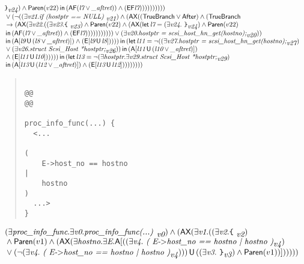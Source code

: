 \documentclass{article}
\newcommand{\U}{\,\mbox{\sf{U}}\,}
\newcommand{\A}{\mbox{\sf{A}}}
\newcommand{\E}{\mbox{\sf{E}}}
\newcommand{\AX}{\mbox{\sf{AX}}}
\newcommand{\AF}{\mbox{\sf{AF}}}
\newcommand{\EF}{\mbox{\sf{EF}}}
\newcommand{\mita}[1]{\mbox{\it{{#1}}}}
\newcommand{\msf}[1]{\mbox{\sf{{#1}}}}
\newcommand{\mth}[1]{\({#1}\)}
\newcommand{\ttlb}{\mbox{\tt \char'173}}
\newcommand{\ttrb}{\mbox{\tt \char'175}}
\begin{document}
\[\begin{array}{l}
{{\ttrb}}_{\mita{v24}}) \wedge \msf{Paren}(v22) \, \mita{\sf{in}} \, (\AF(\mita{l7} \vee \mita{\_aftret})) \wedge (\EF\mita{l7})
)))))))))\\\mbox{} \vee (\neg ((\exists \mita{v21} . \mita{if (hostptr == NULL) }_{\mita{v21}}) \wedge (\AX((\msf{TrueBranch} \vee \msf{After}) \wedge (\msf{TrueBranch}\\\mbox{} \rightarrow (\AX(\exists \mita{v22} . ((\exists \mita{v23} . \mita{{\ttlb}
  }_{\mita{v23}}) \wedge \msf{Paren}(v22) \wedge (\AX(\mita{\sf{let}} \, \mita{l7} = (\exists \mita{v24} . \mita{
{\ttrb}}_{\mita{v24}}) \wedge \msf{Paren}(v22)\\\mbox{} \, \mita{\sf{in}} \, (\AF(\mita{l7} \vee \mita{\_aftret})) \wedge (\EF\mita{l7})
)))))))))) \vee (\exists \mita{v20} . \mita{hostptr = scsi\_host\_hn\_get(hostno);}_{\mita{v20}}))\\\mbox{} \, \mita{\sf{in}} \, (\A[\mita{l9} \U (\mita{l8} \vee \mita{\_aftret})]
) \wedge (\E[\mita{l9} \U \mita{l8}]
)
)
)) \, \mita{\sf{in}} \, (\mita{\sf{let}} \, \mita{l11} = \neg ((\exists \mita{v27} . \mita{hostptr = scsi\_host\_hn\_get(hostno);}_{\mita{v27}})\\\mbox{} \vee (\exists \mita{v26} . \mita{struct Scsi\_Host *hostptr;}_{\mita{v26}})) \, \mita{\sf{in}} \, (\A[\mita{l11} \U (\mita{l10} \vee \mita{\_aftret})]
)\\\mbox{} \wedge (\E[\mita{l11} \U \mita{l10}]
)
)
))) \, \mita{\sf{in}} \, (\mita{\sf{let}} \, \mita{l13} = \neg (\exists \mita{hostptr} . \exists \mita{v29} . \mita{struct Scsi\_Host *hostptr;}_{\mita{v29}})\\\mbox{} \, \mita{\sf{in}} \, (\A[\mita{l13} \U (\mita{l12} \vee \mita{\_aftret})]
) \wedge (\E[\mita{l13} \U \mita{l12}]
)
)
))))))

\end{array}\]

\begin{quote}\begin{verbatim}

@@
@@

proc_info_func(...) {
  <...
    
(
    E->host_no == hostno
|
    hostno
)
  ...>
}
\end{verbatim}\end{quote}

\[\begin{array}{l}
(\exists \mita{proc\_info\_func} . \exists \mita{v0} . \mita{proc\_info\_func(...) }_{\mita{v0}}) \wedge (\AX(\exists \mita{v1} . ((\exists \mita{v2} . \mita{{\ttlb}
  }_{\mita{v2}})\\\mbox{} \wedge \msf{Paren}(v1) \wedge (\AX(\exists \mita{hostno} . \exists \mita{E} . \A[((\exists \mita{v4} . \mita{
(
E-\mth{>}host\_no == hostno
|
hostno
)}_{\mita{v4}})\\\mbox{} \vee (\neg (\exists \mita{v4} . \mita{
(
E-\mth{>}host\_no == hostno
|
hostno
)}_{\mita{v4}}))) \U ((\exists \mita{v3} . \mita{
{\ttrb}}_{\mita{v3}}) \wedge \msf{Paren}(v1))]
)))))
\end{array}\]
\end{document}
